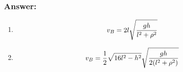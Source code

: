 \subsubsection*{Answer:}

\begin{answer}
    \begin{enumerate}
        \item \begin{align}
                  v_B = 2l \sqrt{\frac{gh}{l^2 + \rho^2}} \notag
              \end{align}
        \item \begin{align}
                  v_B = \frac{1}{2} \sqrt{16l^2 - h^2} \sqrt{\frac{gh}{2 (l^2 + \rho^2) }} \notag
              \end{align}
    \end{enumerate}
\end{answer}


